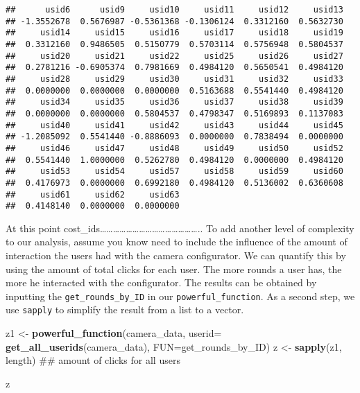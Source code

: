 \documentclass[]{article}
\newenvironment{Shaded}{\begin{snugshade}}{\end{snugshade}}
\newcommand{\KeywordTok}[1]{\textcolor[rgb]{0.13,0.29,0.53}{\textbf{{#1}}}}
\newcommand{\DataTypeTok}[1]{\textcolor[rgb]{0.13,0.29,0.53}{{#1}}}
\newcommand{\StringTok}[1]{\textcolor[rgb]{0.31,0.60,0.02}{{#1}}}
\newcommand{\NormalTok}[1]{{#1}}
\begin{document}
\begin{verbatim}
##      usid6      usid9     usid10     usid11     usid12     usid13 
## -1.3552678  0.5676987 -0.5361368 -0.1306124  0.3312160  0.5632730 
##     usid14     usid15     usid16     usid17     usid18     usid19 
##  0.3312160  0.9486505  0.5150779  0.5703114  0.5756948  0.5804537 
##     usid20     usid21     usid22     usid25     usid26     usid27 
##  0.2781216 -0.6905374  0.7981669  0.4984120  0.5650541  0.4984120 
##     usid28     usid29     usid30     usid31     usid32     usid33 
##  0.0000000  0.0000000  0.0000000  0.5163688  0.5541440  0.4984120 
##     usid34     usid35     usid36     usid37     usid38     usid39 
##  0.0000000  0.0000000  0.5804537  0.4798347  0.5169893  0.1137083 
##     usid40     usid41     usid42     usid43     usid44     usid45 
## -1.2085092  0.5541440 -0.8886093  0.0000000  0.7838494  0.0000000 
##     usid46     usid47     usid48     usid49     usid50     usid52 
##  0.5541440  1.0000000  0.5262780  0.4984120  0.0000000  0.4984120 
##     usid53     usid54     usid57     usid58     usid59     usid60 
##  0.4176973  0.0000000  0.6992180  0.4984120  0.5136002  0.6360608 
##     usid61     usid62     usid63 
##  0.4148140  0.0000000  0.0000000
\end{verbatim}

At this point
cost\_ids\ldots{}\ldots{}\ldots{}\ldots{}\ldots{}\ldots{}\ldots{}\ldots{}\ldots{}\ldots{}\ldots{}\ldots{}\ldots{}\ldots{}\ldots{}..
To add another level of complexity to our analysis, assume you know need
to include the influence of the amount of interaction the users had with
the camera configurator. We can quantify this by using the amount of
total clicks for each user. The more rounds a user has, the more he
interacted with the configurator. The results can be obtained by
inputting the \texttt{get\_rounds\_by\_ID} in our
\texttt{powerful\_function}. As a second step, we use \texttt{sapply} to
simplify the result from a list to a vector.

\begin{Shaded}
\begin{Highlighting}[]
\NormalTok{z1 <-}\StringTok{ }\KeywordTok{powerful_function}\NormalTok{(camera_data, }\DataTypeTok{userid=} \KeywordTok{get_all_userids}\NormalTok{(camera_data),}
                        \DataTypeTok{FUN=}\NormalTok{get_rounds_by_ID)}
\NormalTok{z <-}\StringTok{ }\KeywordTok{sapply}\NormalTok{(z1, length)  ## amount of clicks for all users}

\NormalTok{z}
\end{Highlighting}
\end{Shaded}
\end{document}
